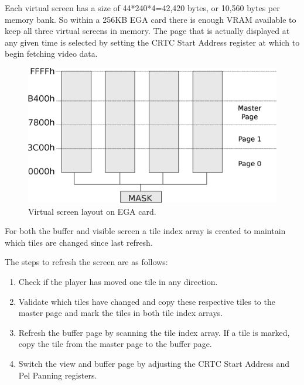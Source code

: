 \documentclass[book.tex]{subfiles}
\begin{document}
\par
Each virtual screen has a size of 44*240*4=42,420 bytes, or 10,560 bytes per memory bank. So within a 256KB EGA card there is enough VRAM available to keep all three virtual screens in memory. The page that is actually displayed at any given time is selected by setting the CRTC Start Address register at which to begin fetching video data.\\



\begin{figure}[H]
\centering
\includegraphics[width=\textwidth]{imgs/drawings/ega_ram_architecture.eps}
\caption{Virtual screen layout on EGA card.}
\label{fig:ega_ram_arch}
\end{figure}

\par
For both the buffer and visible screen a tile index array is created to maintain which tiles are changed since last refresh. \\

\par
\begin{minipage}{\textwidth}
  
  \end{minipage}
  \label{ega_refresh}
  \par

The steps to refresh the screen are as follows:
\begin{enumerate}
\item Check if the player has moved one tile in any direction.
\item Validate which tiles have changed and copy these respective tiles to the master page and mark the tiles in both tile index arrays. 
\item Refresh the buffer page by scanning the tile index array. If a tile is marked, copy the tile from the master page to the buffer page.
\item Switch the view and buffer page by adjusting the CRTC Start Address and Pel Panning registers.
\end{enumerate}
\end{document}

